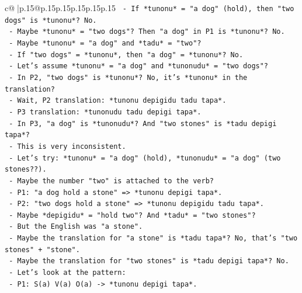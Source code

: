 \documentclass{article}
\begin{document}
{\begin{supertabular}{c@{$\;$}|p{.15\linewidth}@{}p{.15\linewidth}p{.15\linewidth}p{.15\linewidth}p{.15\linewidth}p{.15\linewidth}}
{{{\texttt{                      {-} If *tunonu* = "a dog" (hold), then "two dogs" is *tunonu*? No.} \\
\texttt{                      {-} Maybe *tunonu* = "two dogs"? Then "a dog" in P1 is *tunonu*? No.} \\
\texttt{                      {-} Maybe *tunonu* = "a dog" and *tadu* = "two"?} \\
\texttt{                      {-} If "two dogs" = *tunonu*, then "a dog" = *tunonu*? No.} \\
\texttt{                      {-} Let's assume *tunonu* = "a dog" and *tunonudu* = "two dogs"?} \\
\texttt{                      {-} In P2, "two dogs" is *tunonu*? No, it's *tunonu* in the translation?} \\
\texttt{                      {-} Wait, P2 translation: *tunonu depigidu tadu tapa*.} \\
\texttt{                      {-} P3 translation: *tunonudu tadu depigi tapa*.} \\
\texttt{                      {-} In P3, "a dog" is *tunonudu*? And "two stones" is *tadu depigi tapa*?} \\
\texttt{                      {-} This is very inconsistent.} \\
\texttt{                      {-} Let's try: *tunonu* = "a dog" (hold), *tunonudu* = "a dog" (two stones??).} \\
\texttt{                      {-} Maybe the number "two" is attached to the verb?} \\
\texttt{                      {-} P1: "a dog hold a stone" => *tunonu depigi tapa*.} \\
\texttt{                      {-} P2: "two dogs hold a stone" => *tunonu depigidu tadu tapa*.} \\
\texttt{                        {-} Maybe *depigidu* = "hold two"? And *tadu* = "two stones"?} \\
\texttt{                        {-} But the English was "a stone".} \\
\texttt{                        {-} Maybe the translation for "a stone" is *tadu tapa*? No, that's "two stones" + "stone".} \\
\texttt{                        {-} Maybe the translation for "two stones" is *tadu depigi tapa*? No.} \\
\texttt{                        {-} Let's look at the pattern:} \\
\texttt{                          {-} P1: S(a) V(a) O(a) {-}> *tunonu depigi tapa*.} \\
}}}
\end{supertabular}}
\end{document}
